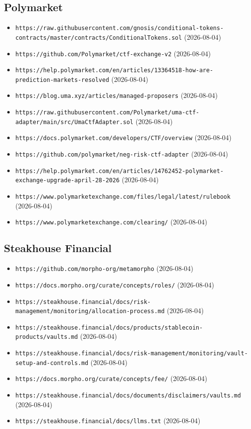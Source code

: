 \subsection*{Polymarket}
\begin{itemize}\setlength{\itemsep}{0pt}\small
\item \texttt{https://raw.githubusercontent.com/gnosis/conditional-tokens-contracts/master/contracts/ConditionalTokens.sol} (2026-08-04)
\item \texttt{https://github.com/Polymarket/ctf-exchange-v2} (2026-08-04)
\item \texttt{https://help.polymarket.com/en/articles/13364518-how-are-prediction-markets-resolved} (2026-08-04)
\item \texttt{https://blog.uma.xyz/articles/managed-proposers} (2026-08-04)
\item \texttt{https://raw.githubusercontent.com/Polymarket/uma-ctf-adapter/main/src/UmaCtfAdapter.sol} (2026-08-04)
\item \texttt{https://docs.polymarket.com/developers/CTF/overview} (2026-08-04)
\item \texttt{https://github.com/polymarket/neg-risk-ctf-adapter} (2026-08-04)
\item \texttt{https://help.polymarket.com/en/articles/14762452-polymarket-exchange-upgrade-april-28-2026} (2026-08-04)
\item \texttt{https://www.polymarketexchange.com/files/legal/latest/rulebook} (2026-08-04)
\item \texttt{https://www.polymarketexchange.com/clearing/} (2026-08-04)
\end{itemize}

\subsection*{Steakhouse Financial}
\begin{itemize}\setlength{\itemsep}{0pt}\small
\item \texttt{https://github.com/morpho-org/metamorpho} (2026-08-04)
\item \texttt{https://docs.morpho.org/curate/concepts/roles/} (2026-08-04)
\item \texttt{https://steakhouse.financial/docs/risk-management/monitoring/allocation-process.md} (2026-08-04)
\item \texttt{https://steakhouse.financial/docs/products/stablecoin-products/vaults.md} (2026-08-04)
\item \texttt{https://steakhouse.financial/docs/risk-management/monitoring/vault-setup-and-controls.md} (2026-08-04)
\item \texttt{https://docs.morpho.org/curate/concepts/fee/} (2026-08-04)
\item \texttt{https://steakhouse.financial/docs/documents/disclaimers/vaults.md} (2026-08-04)
\item \texttt{https://steakhouse.financial/docs/llms.txt} (2026-08-04)
\end{itemize}
